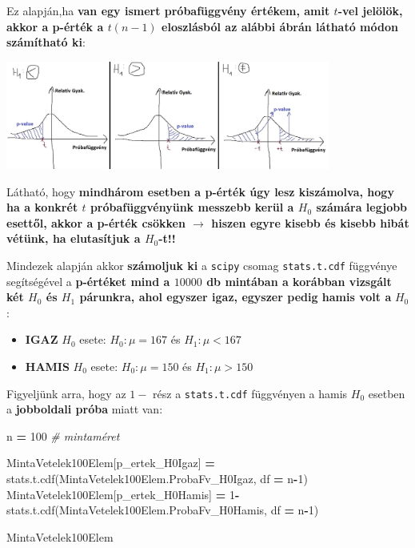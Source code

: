 \documentclass[
]{book}
\newenvironment{Shaded}{\begin{snugshade}}{\end{snugshade}}
\newcommand{\CommentTok}[1]{\textcolor[rgb]{0.56,0.35,0.01}{\textit{#1}}}
\newcommand{\DecValTok}[1]{\textcolor[rgb]{0.00,0.00,0.81}{#1}}
\newcommand{\NormalTok}[1]{#1}
\newcommand{\OperatorTok}[1]{\textcolor[rgb]{0.81,0.36,0.00}{\textbf{#1}}}
\newcommand{\StringTok}[1]{\textcolor[rgb]{0.31,0.60,0.02}{#1}}
\providecommand{\tightlist}{%
  \setlength{\itemsep}{0pt}\setlength{\parskip}{0pt}}
\begin{document}
Ez alapján,ha \textbf{van egy ismert próbafüggvény értékem, amit \(t\)-vel jelölök, akkor a p-érték a \(t(n-1)\) eloszlásból az alábbi ábrán látható módon számítható ki}:

\includegraphics[width=0.8\textwidth,height=\textheight]{pval_fromt.jpg}

Látható, hogy \textbf{mindhárom esetben a p-érték úgy lesz kiszámolva, hogy ha a konkrét \(t\) próbafüggvényünk messzebb kerül a \(H_0\) számára legjobb esettől, akkor a p-érték csökken \(\rightarrow\) hiszen egyre kisebb és kisebb hibát vétünk, ha elutasítjuk a \(H_0\)-t!!}

Mindezek alapján akkor \textbf{számoljuk ki} a \texttt{scipy} csomag \texttt{stats.t.cdf} függvénye segítségével a \textbf{p-értéket mind a \(10000\) db mintában a korábban vizsgált két \(H_0\) és \(H_1\) párunkra, ahol egyszer igaz, egyszer pedig hamis volt a} \(H_0\):

\begin{itemize}
\tightlist
\item
  \textbf{IGAZ} \(H_0\) esete: \(H_0:\mu=167\) és \(H_1: \mu < 167\)
\item
  \textbf{HAMIS} \(H_0\) esete: \(H_0:\mu=150\) és \(H_1: \mu > 150\)
\end{itemize}

Figyeljünk arra, hogy az \(1-\) rész a \texttt{stats.t.cdf} függvényen a hamis \(H_0\) esetben a \textbf{jobboldali próba} miatt van:

\begin{Shaded}
\begin{Highlighting}[]
\NormalTok{n }\OperatorTok{=} \DecValTok{100} \CommentTok{\# mintaméret}

\NormalTok{MintaVetelek100Elem[}\StringTok{\textquotesingle{}p\_ertek\_H0Igaz\textquotesingle{}}\NormalTok{] }\OperatorTok{=}\NormalTok{ stats.t.cdf(MintaVetelek100Elem.ProbaFv\_H0Igaz, df }\OperatorTok{=}\NormalTok{ n}\OperatorTok{{-}}\DecValTok{1}\NormalTok{)}
\NormalTok{MintaVetelek100Elem[}\StringTok{\textquotesingle{}p\_ertek\_H0Hamis\textquotesingle{}}\NormalTok{] }\OperatorTok{=} \DecValTok{1}\OperatorTok{{-}}\NormalTok{stats.t.cdf(MintaVetelek100Elem.ProbaFv\_H0Hamis, df }\OperatorTok{=}\NormalTok{ n}\OperatorTok{{-}}\DecValTok{1}\NormalTok{)}

\NormalTok{MintaVetelek100Elem}
\end{Highlighting}
\end{Shaded}
\end{document}

